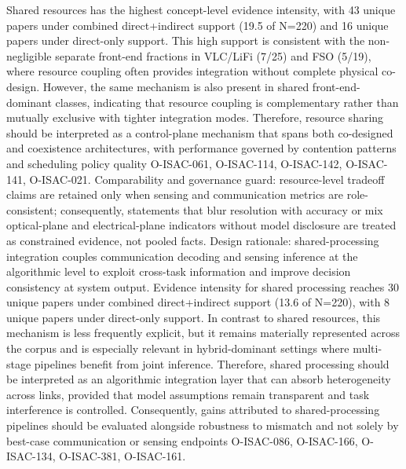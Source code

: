 {}Shared resources has the highest concept-level evidence intensity, with 43 unique papers under combined direct+indirect support (19.5\markdownRendererPercentSign{} of N=220) and 16 unique papers under direct-only support. This high support is consistent with the non-negligible separate front-end fractions in VLC/LiFi (7/25) and FSO (5/19), where resource coupling often provides integration without complete physical co-design. However, the same mechanism is also present in shared front-end-dominant classes, indicating that resource coupling is complementary rather than mutually exclusive with tighter integration modes. Therefore, resource sharing should be interpreted as a control-plane mechanism that spans both co-designed and coexistence architectures, with performance governed by contention patterns and scheduling policy quality O-ISAC-061, O-ISAC-114, O-ISAC-142, O-ISAC-141, O-ISAC-021.\markdownRendererParagraphSeparator
{}Comparability and governance guard: resource-level tradeoff claims are retained only when sensing and communication metrics are role-consistent; consequently, statements that blur resolution with accuracy or mix optical-plane and electrical-plane indicators without model disclosure are treated as constrained evidence, not pooled facts.\markdownRendererInterblockSeparator
{}
\markdownRendererSectionEnd \markdownRendererSectionBegin
{}\markdownRendererInterblockSeparator
{}Design rationale: shared-processing integration couples communication decoding and sensing inference at the algorithmic level to exploit cross-task information and improve decision consistency at system output.\markdownRendererParagraphSeparator
{}Evidence intensity for shared processing reaches 30 unique papers under combined direct+indirect support (13.6\markdownRendererPercentSign{} of N=220), with 8 unique papers under direct-only support. In contrast to shared resources, this mechanism is less frequently explicit, but it remains materially represented across the corpus and is especially relevant in hybrid-dominant settings where multi-stage pipelines benefit from joint inference. Therefore, shared processing should be interpreted as an algorithmic integration layer that can absorb heterogeneity across links, provided that model assumptions remain transparent and task interference is controlled. Consequently, gains attributed to shared-processing pipelines should be evaluated alongside robustness to mismatch and not solely by best-case communication or sensing endpoints O-ISAC-086, O-ISAC-166, O-ISAC-134, O-ISAC-381, O-ISAC-161.\markdownRendererParagraphSeparator

